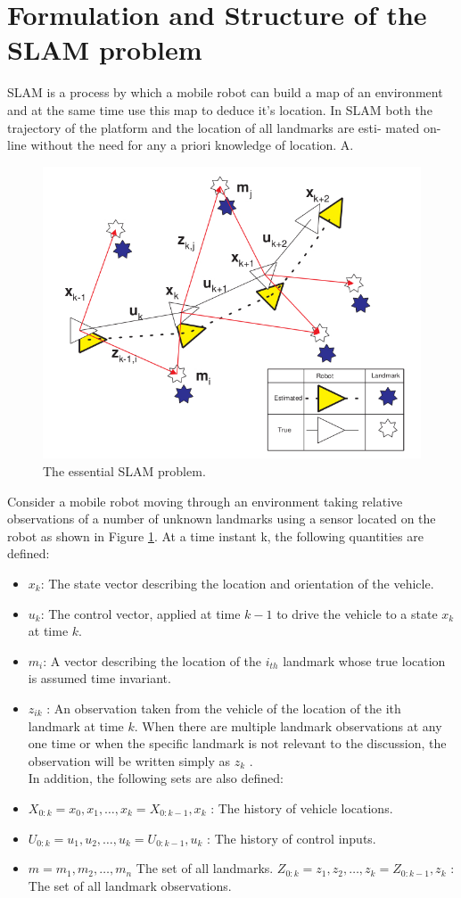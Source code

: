 \documentclass[12pt]{article}
\begin{document}
\section{Formulation and Structure of the SLAM problem}
SLAM is a process by which a mobile robot can build
a map of an environment and at the same time use this map to deduce it’s location. In SLAM both the trajectory of the platform and the location of all landmarks are esti- mated on-line without the need for any a priori knowledge of location.
A.
\begin{figure}[ht]
    \centering
    \includegraphics[width=160mm]{structure.jpg}
    \caption{The essential SLAM problem.}
    \label{slamstruct}
\end{figure} Consider a mobile robot moving through an environment
taking relative observations of a number of unknown landmarks using a sensor located on the robot as shown in Figure \ref{slamstruct}. At a time instant k, the following quantities are defined:
\begin{itemize}
\item $x_k$: The state vector describing the location and orientation of the vehicle.
\item $u_k$: The control vector, applied at time $k-1$ to drive the vehicle to a state $x_k$ at time $k$.
\item $m_i$: A vector describing the location of the $i_{th}$ landmark whose true location is assumed time invariant.
\item $z_{ik}$ : An observation taken from the vehicle of the location of the ith landmark at time $k$. When there are multiple
landmark observations at any one time or when the specific landmark is not relevant to the discussion, the observation
will be written simply as $z_k$ .\\
In addition, the following sets are also defined:
\item $X_{0:k} = {x_0,x_1,\dots,x_k} = {X_{0:k-1},x_k}$ : The history of vehicle locations.
\item $U_{0:k} = {u_1,u_2,\dots,u_k} = {U_{0:k-1},u_k}$ : The history of control inputs.
\item $m= {m_1,m_2, \dots ,m_n}$ The set of all landmarks. $Z_{0:k} = {z_1, z_2,\dots,z_k} = {Z_{0:k−1}, z_k}$ : The set of all landmark observations.
\end{itemize}
\end{document}
